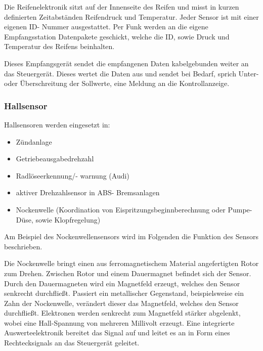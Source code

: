 	                
	                Die Reifenelektronik sitzt auf der Innenseite des Reifen und misst in kurzen definierten Zeitabständen Reifendruck und Temperatur. 
	                Jeder Sensor ist mit einer eigenen ID- Nummer ausgestattet. Per Funk werden an die eigene Empfangsstation Datenpakete geschickt, welche die ID, sowie Druck und Temperatur des Reifens beinhalten.
	
	                Dieses Empfangsgerät sendet die empfangenen Daten kabelgebunden weiter an das Steuergerät. Dieses wertet die Daten aus und sendet bei Bedarf, sprich Unter- oder Überschreitung der Sollwerte, eine Meldung an die Kontrollanzeige.
					
	                \subsubsection{Hallsensor}
	
					Hallsensoren werden eingesetzt in: 
					\begin{itemize}
						\item Zündanlage
						\item Getriebeausgabedrehzahl
						\item Radlöseerkennung/- warnung (Audi)
						\item aktiver Drehzahlsensor in ABS- Bremsanlagen
						\item Nockenwelle (Koordination von Eispritzungsbeginnberechnung oder Pumpe-Düse, sowie Klopfregelung)
					\end{itemize}
					
	                Am Beispiel des Nockenwellensensors wird im Folgenden die Funktion des Sensors beschrieben.
	                
	                Die Nockenwelle bringt einen aus ferromagnetischem Material angefertigten Rotor zum Drehen. Zwischen Rotor und einem Dauermagnet befindet sich der Sensor.
	                Durch den Dauermagneten wird ein Magnetfeld erzeugt, welches den Sensor senkrecht durchfließt. Passiert ein metallischer Gegenstand, beispielsweise ein Zahn der Nockenwelle, verändert dieser das Magnetfeld, welches den Sensor durchfließt.
					Elektronen werden senkrecht zum Magnetfeld stärker abgelenkt, wobei eine Hall-Spannung von mehreren Millivolt erzeugt. Eine integrierte Auswerteelektronik bereitet das Signal auf und leitet es an in Form eines Rechtecksignals an das Steuergerät geleitet. \cite{TS_hall}
	
